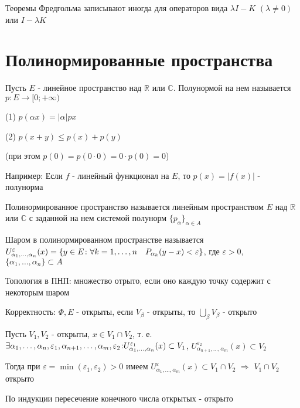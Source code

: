 \documentclass[a4paper,12pt]{report}
\newcommand*{\hm}[1]{#1\nobreak\discretionary{}%
            {\hbox{$\mathsurround=0pt #1$}}{}}
\begin{document}
\begin{rem}
Теоремы Фредгольма записывают иногда для операторов вида $\lambda I-K$ $(\lambda\ne0)$ или $I-\lambda K$
\end{rem}








\chapter{Полинормированные пространства}

\begin{df}
Пусть $E$ - линейное пространство над $\mathbb R$ или $\mathbb C$. Полунормой на нем называется $p\colon E\to[0;+\infty)$

(1) $p(\alpha x)=|\alpha|px$

(2) $p(x+y)\le p(x)+p(y)$

(при этом $p(0)=p(0\cdot0)=0\cdot p(0)=0$)

\noindent Например: Если $f$ - линейный функционал на $E$, то $p(x)=|f(x)|$ - {полунорма}
\end{df}
 


\begin{df}
Полинормированное пространство называется линейным пространством $E$ над $\mathbb R$ или $\mathbb C$ с заданной на нем системой полунорм $\{p_\alpha\}_{\alpha\in A}$

Шаром в полинормированном пространстве называется $U_{\alpha_1,\ldots,\alpha_n}^\varepsilon(x)\hm=\{y\in E\colon\forall k=1,\ldots,n\quad P_{\alpha_k}(y-x)<\varepsilon\}$, где $\varepsilon>0$, $\{\alpha_1,\ldots,\alpha_n\}\subset A$

Топология в ПНП: множество отрыто, если оно каждую точку содержит с некоторым шаром

Корректность: $\Phi,E$ - открыты, если $V_\beta$ - открыты, то $\bigcup\limits_\beta V_\beta$ - открыто

Пусть $V_1,V_2$ - открыты, $x\in V_1\cap V_2$, т. е. $\exists\alpha_1,\ldots,\alpha_n,\varepsilon_1,\alpha_{n+1},\ldots,\alpha_m,\varepsilon_2\colon\\ U_{\alpha_1,\ldots,\alpha_n}^{\varepsilon_1}(x)\subset V_1$, $U_{\alpha_{n+1},\ldots,\alpha_m}^{\varepsilon_2}(x)\subset V_2$

Тогда при $\varepsilon=\min(\varepsilon_1,\varepsilon_2)>0$ имеем $U_{\alpha_1,\ldots,\alpha_m}^\varepsilon(x)\subset V_1\cap V_2$ $\Rightarrow$ $V_1\cap V_2$ открыто

По индукции пересечение конечного числа открытых - открыто
\end{df}
 
\end{document}
